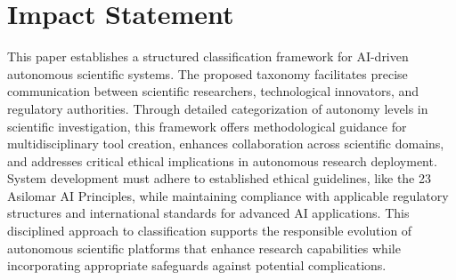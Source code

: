 \section*{Impact Statement}

This paper establishes a structured classification framework for AI-driven autonomous scientific systems. The proposed taxonomy facilitates precise communication between scientific researchers, technological innovators, and regulatory authorities. Through detailed categorization of autonomy levels in scientific investigation, this framework offers methodological guidance for multidisciplinary tool creation, enhances collaboration across scientific domains, and addresses critical ethical implications in autonomous research deployment. System development must adhere to established ethical guidelines, like the 23 Asilomar AI Principles, while maintaining compliance with applicable regulatory structures and international standards for advanced AI applications. This disciplined approach to classification supports the responsible evolution of autonomous scientific platforms that enhance research capabilities while incorporating appropriate safeguards against potential complications.